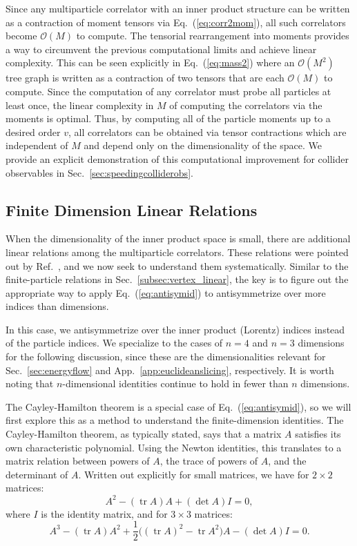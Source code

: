 \documentclass[aps,prd,floatfix,preprintnumbers,twocolumn,groupedaddress,nofootinbib,longbibliography,10pt]{revtex4-1}
\renewcommand{\O}{\mathcal{O}}
\DeclareMathOperator{\tr}{tr}
\DeclareRobustCommand{\Sec}[1]{Sec.~\ref{#1}}
\DeclareRobustCommand{\App}[1]{App.~\ref{#1}}
\DeclareRobustCommand{\Eq}[1]{Eq.~(\ref{#1})}
\DeclareRobustCommand{\Ref}[1]{Ref.~\cite{#1}}
\begin{document}
Since any multiparticle correlator with an inner product structure can be written as a contraction of moment tensors via \Eq{eq:corr2mom}, all such correlators become $\O(M)$ to compute.
%
The tensorial rearrangement into moments provides a way to circumvent the previous computational limits and achieve linear complexity.
%
This can be seen explicitly in \Eq{eq:mass2} where an $\O(M^2)$ tree graph is written as a contraction of two tensors that are each $\O(M)$ to compute.
%
Since the computation of any correlator must probe all particles at least once, the linear complexity in $M$ of computing the correlators via the moments is optimal.
%
Thus, by computing all of the particle moments up to a desired order $v$, all correlators can be obtained via tensor contractions which are independent of $M$ and depend only on the dimensionality of the space.
%
We provide an explicit demonstration of this computational improvement for collider observables in \Sec{sec:speedingcolliderobs}.


\subsection{Finite Dimension Linear Relations}
\label{subsec:edge_linear}


When the dimensionality of the inner product space is small, there are additional linear relations among the multiparticle correlators.
%
These relations were pointed out by \Ref{Hogervorst:2014rta}, and we now seek to understand them systematically.
%
Similar to the finite-particle relations in \Sec{subsec:vertex_linear}, the key is to figure out the appropriate way to apply \Eq{eq:antisymid} to antisymmetrize over more indices than dimensions.


In this case, we antisymmetrize over the inner product (Lorentz) indices instead of the particle indices.
%
We specialize to the cases of $n= 4$ and $n=3$ dimensions for the following discussion, since these are the dimensionalities relevant for \Sec{sec:energyflow} and \App{app:euclideanslicing}, respectively.
%
It is worth noting that $n$-dimensional identities continue to hold in fewer than $n$ dimensions.


The Cayley-Hamilton theorem is a special case of \Eq{eq:antisymid}, so we will first explore this as a method to understand the finite-dimension identities.
%
The Cayley-Hamilton theorem, as typically stated, says that a matrix $A$ satisfies its own characteristic polynomial.
%
Using the Newton identities, this translates to a matrix relation between powers of $A$, the trace of powers of $A$, and the determinant of $A$.
%
Written out explicitly for small matrices, we have for $2\times2$ matrices:
%
\begin{equation}\label{eq:CH22}
A^2 - (\tr A) A + (\det A) I=0,
\end{equation}
%
where $I$ is the identity matrix, and for $3\times 3$ matrices:
%
\begin{equation}\label{eq:CH33}
A^3 - (\tr A)A^2  + \frac{1}{2} \big( (\tr A)^2 - \tr A^2 \big) A- (\det A)I=0.
\end{equation}
\end{document}
